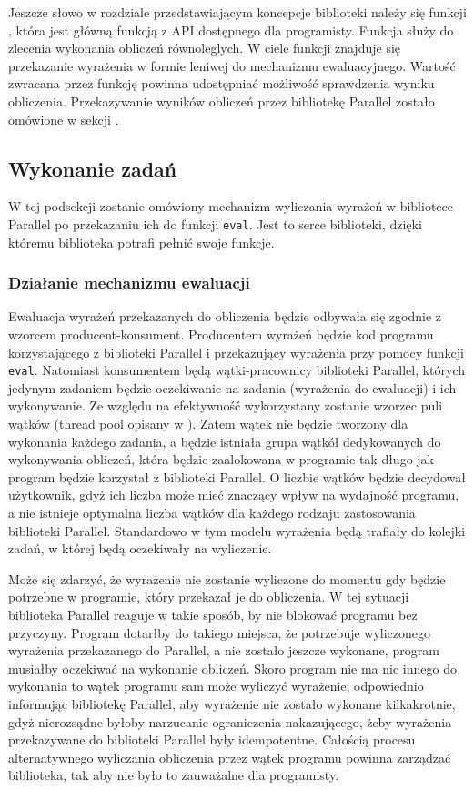   Jeszcze słowo w rozdziale przedstawiającym koncepcje biblioteki należy się funkcji \feval, która jest główną funkcją z API dostępnego dla programisty.
  Funkcja służy do zlecenia wykonania obliczeń równoleglych.
  W ciele funkcji znajduje się przekazanie wyrażenia w formie leniwej do mechanizmu ewaluacyjnego.
  Wartość zwracana przez funkcję powinna udostępniać możliwość sprawdzenia wyniku obliczenia.
  Przekazywanie wyników obliczeń przez bibliotekę Parallel zostało omówione w sekcji .
  
\subsection{Wykonanie zadań}

  W tej podsekcji zostanie omówiony mechanizm wyliczania wyrażeń w bibliotece Parallel po przekazaniu ich do funkcji \texttt{eval}.
  Jest to serce biblioteki, dzięki któremu biblioteka potrafi pełnić swoje funkcje.
  
  \subsubsection{Działanie mechanizmu ewaluacji}
  
  Ewaluacja wyrażeń przekazanych do obliczenia będzie odbywała się zgodnie z wzorcem producent-konsument.
  Producentem wyrażeń będzie kod programu korzystającego z biblioteki Parallel i przekazujący wyrażenia przy pomocy funkcji \texttt{eval}.
  Natomiast konsumentem będą wątki-pracownicy biblioteki Parallel, których jedynym zadaniem będzie oczekiwanie na zadania (wyrażenia do ewaluacji) i ich wykonywanie.
  Ze względu na efektywność wykorzystany zostanie wzorzec puli wątków (thread pool opisany w \cite{threadpool}).
  Zatem wątek nie będzie tworzony dla wykonania każdego zadania, a będzie istniała grupa wątkół dedykowanych do wykonywania obliczeń, która będzie zaalokowana w programie tak długo jak program będzie korzystał z biblioteki Parallel.
  O liczbie wątków będzie decydował użytkownik, gdyż ich liczba może mieć znaczący wpływ na wydajność programu, a nie istnieje optymalna liczba wątków dla każdego rodzaju zastosowania biblioteki Parallel.
  Standardowo w tym modelu wyrażenia będą trafiały do kolejki zadań, w której będą oczekiwały na wyliczenie.
  
  Może się zdarzyć, że wyrażenie nie zostanie wyliczone do momentu gdy będzie potrzebne w programie, który przekazał je do obliczenia.
  W tej sytuacji biblioteka Parallel reaguje w takie sposób, by nie blokować programu bez przyczyny.
  Program dotarłby do takiego miejsca, że potrzebuje wyliczonego wyrażenia przekazanego do Parallel, a nie zostało jeszcze wykonane, program musiałby oczekiwać na wykonanie obliczeń.
  Skoro program nie ma nic innego do wykonania to wątek programu sam może wyliczyć wyrażenie, odpowiednio informując bibliotekę Parallel, aby wyrażenie nie zostało wykonane kilkakrotnie, 
  gdyż nierozsądne byłoby narzucanie ograniczenia nakazującego, żeby wyrażenia przekazywane do biblioteki Parallel były idempotentne.
  Całością procesu alternatywnego wyliczania obliczenia przez wątek programu powinna zarządzać biblioteka, tak aby nie było to zauważalne dla programisty.
  
